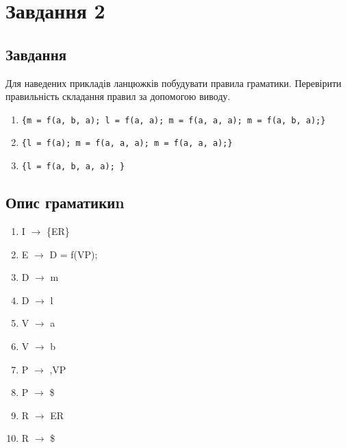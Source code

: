 \newpage
\section{Завдання 2}
\subsection{Завдання}
Для наведених прикладів ланцюжків побудувати правила граматики.
Перевірити правильність складання правил за допомогою виводу.
\begin{enumerate}
    \item \verb|{m = f(a, b, a); l = f(a, a); m = f(a, a, a); m = f(a, b, a);}|
    \item \verb|{l = f(a); m = f(a, a, a); m = f(a, a, a);}|
    \item \verb|{l = f(a, b, a, a); }|
\end{enumerate}

\subsection{Опис граматикиn}
\begin{enumerate}
    \item  I $\to$ \{ER\}
    \item  E $\to$ D = f(VP);
    \item  D $\to$ m
    \item  D $\to$ l
    \item  V $\to$ a
    \item  V $\to$ b
    \item  P $\to$ ,VP
    \item  P $\to$ \$
    \item  R $\to$ ER
    \item  R $\to$ \$
\end{enumerate}


\newpage
